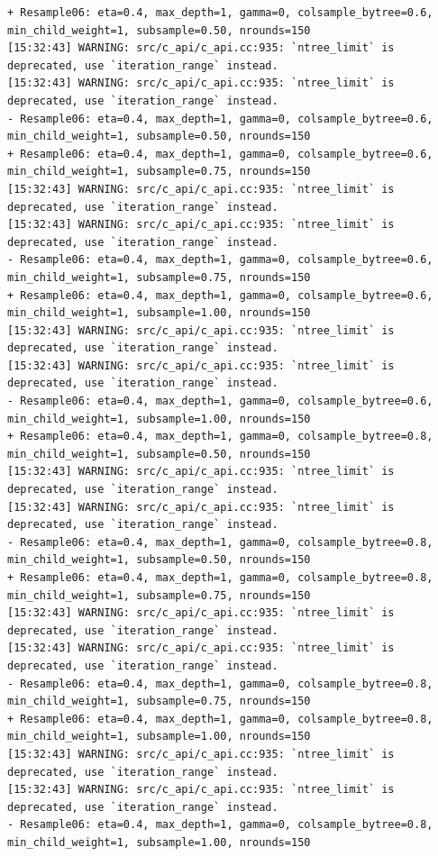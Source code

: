 \documentclass[
  letterpaper,
  DIV=11,
  numbers=noendperiod]{scrartcl}
\begin{document}
\begin{verbatim}
+ Resample06: eta=0.4, max_depth=1, gamma=0, colsample_bytree=0.6, min_child_weight=1, subsample=0.50, nrounds=150 
[15:32:43] WARNING: src/c_api/c_api.cc:935: `ntree_limit` is deprecated, use `iteration_range` instead.
[15:32:43] WARNING: src/c_api/c_api.cc:935: `ntree_limit` is deprecated, use `iteration_range` instead.
- Resample06: eta=0.4, max_depth=1, gamma=0, colsample_bytree=0.6, min_child_weight=1, subsample=0.50, nrounds=150 
+ Resample06: eta=0.4, max_depth=1, gamma=0, colsample_bytree=0.6, min_child_weight=1, subsample=0.75, nrounds=150 
[15:32:43] WARNING: src/c_api/c_api.cc:935: `ntree_limit` is deprecated, use `iteration_range` instead.
[15:32:43] WARNING: src/c_api/c_api.cc:935: `ntree_limit` is deprecated, use `iteration_range` instead.
- Resample06: eta=0.4, max_depth=1, gamma=0, colsample_bytree=0.6, min_child_weight=1, subsample=0.75, nrounds=150 
+ Resample06: eta=0.4, max_depth=1, gamma=0, colsample_bytree=0.6, min_child_weight=1, subsample=1.00, nrounds=150 
[15:32:43] WARNING: src/c_api/c_api.cc:935: `ntree_limit` is deprecated, use `iteration_range` instead.
[15:32:43] WARNING: src/c_api/c_api.cc:935: `ntree_limit` is deprecated, use `iteration_range` instead.
- Resample06: eta=0.4, max_depth=1, gamma=0, colsample_bytree=0.6, min_child_weight=1, subsample=1.00, nrounds=150 
+ Resample06: eta=0.4, max_depth=1, gamma=0, colsample_bytree=0.8, min_child_weight=1, subsample=0.50, nrounds=150 
[15:32:43] WARNING: src/c_api/c_api.cc:935: `ntree_limit` is deprecated, use `iteration_range` instead.
[15:32:43] WARNING: src/c_api/c_api.cc:935: `ntree_limit` is deprecated, use `iteration_range` instead.
- Resample06: eta=0.4, max_depth=1, gamma=0, colsample_bytree=0.8, min_child_weight=1, subsample=0.50, nrounds=150 
+ Resample06: eta=0.4, max_depth=1, gamma=0, colsample_bytree=0.8, min_child_weight=1, subsample=0.75, nrounds=150 
[15:32:43] WARNING: src/c_api/c_api.cc:935: `ntree_limit` is deprecated, use `iteration_range` instead.
[15:32:43] WARNING: src/c_api/c_api.cc:935: `ntree_limit` is deprecated, use `iteration_range` instead.
- Resample06: eta=0.4, max_depth=1, gamma=0, colsample_bytree=0.8, min_child_weight=1, subsample=0.75, nrounds=150 
+ Resample06: eta=0.4, max_depth=1, gamma=0, colsample_bytree=0.8, min_child_weight=1, subsample=1.00, nrounds=150 
[15:32:43] WARNING: src/c_api/c_api.cc:935: `ntree_limit` is deprecated, use `iteration_range` instead.
[15:32:43] WARNING: src/c_api/c_api.cc:935: `ntree_limit` is deprecated, use `iteration_range` instead.
- Resample06: eta=0.4, max_depth=1, gamma=0, colsample_bytree=0.8, min_child_weight=1, subsample=1.00, nrounds=150 

\end{verbatim}
\end{document}
